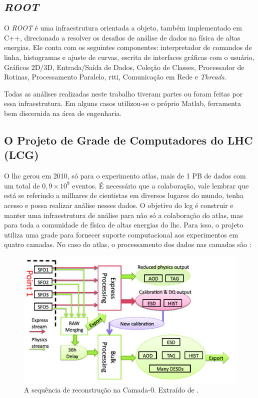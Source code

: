\subsection{\emph{ROOT}}
\label{ssec:root}


O \emph{ROOT} é uma infraestrutura orientada a objeto, também implementado em C++, 
direcionado a resolver os desafios de análise de dados na física de altas 
energias. Ele conta com os seguintes componentes: interpretador de comandos 
de linha, histogramas e ajuste de curvas, escrita de interfaces gráficas com 
o usuário, Gráficos 2D/3D, Entrada/Saída de Dados, Coleção de Classes, 
Processador de Rotinas, Processamento Paralelo, \gls{rtti}, Comunicação em
Rede e \emph{Threads}.

Todas as análises realizadas neste trabalho tiveram partes ou foram feitas por essa
infraestrutura. Em alguns casos utilizou-se o próprio Matlab, ferramenta bem
discernida na área de engenharia.

\subsection{O Projeto de Grade de Computadores do LHC (LCG)}
\label{ssec:lcg}

O \gls{lhc} gerou em 2010, só para o experimento \gls{atlas}, mais de 1 PB de dados
com um total de $0,9 \times 10^9$ eventos. É necessário que a colaboração, 
vale lembrar que está se referindo a milhares de cientistas em diversos lugares
do mundo, tenha acesso e possa realizar análise nesses dados. 
O objetivo do \gls{lcg} é construir e manter uma 
infraestrutura de análise para não só a colaboração do \gls{atlas}, mas para toda 
a comunidade de física de altas energias do \gls{lhc}.
Para isso, o projeto utiliza uma grade para fornecer suporte computacional 
aos experimentos em quatro camadas. No caso do \gls{atlas}, o processamento dos
dados nas camadas são \cite{grid,atlas_computing_tdr,tier0_reconstruction_atlas}:

\begin{figure}[h!t]
\centering
\includegraphics[width=\textwidth]{imagens/tier0_stream.png}
\caption[A sequência de reconstrução na Camada-0]{A sequência de reconstrução na Camada-0. Extraído de
\cite{tier0_reconstruction_atlas}.}
\label{fig:tier0_stream}
\end{figure}

